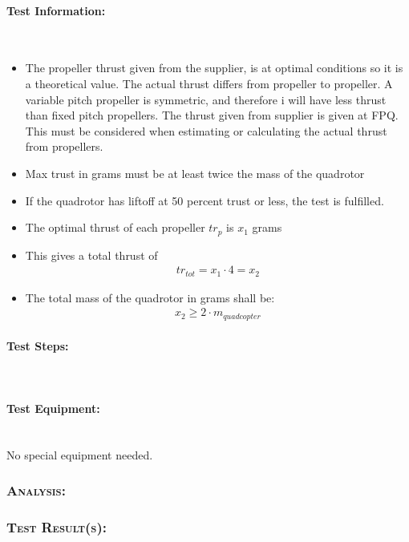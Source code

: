 \paragraph{Test Information:}\mbox{}\\
\begin{itemize}
\item  The propeller thrust given from the supplier, is at optimal conditions so it is a theoretical value. The actual thrust differs from propeller to propeller. A variable pitch propeller is symmetric, and therefore i will have less thrust than fixed pitch propellers. The thrust given from supplier is given at FPQ. This must be considered when estimating or calculating the actual thrust from propellers.
\item Max trust in grams must be at least twice the mass of the quadrotor
\item If the quadrotor has liftoff at 50 percent trust or less, the test is fulfilled.
\item The optimal thrust of each propeller $tr_p$ is $x_1$ grams
\item This gives a total thrust of
    \begin{equation}
    \begin{split}
        tr_{tot} = x_1\cdot4 = x_2
    \end{split}
    \end{equation}
\item The total mass of the quadrotor in  grams shall be:
    \begin{equation}
    \begin{split}
        x_2 \geq 2\cdot m_{quadcopter} 
    \end{split}
    \end{equation}
\end{itemize}
\paragraph{Test Steps:}\mbox{}\\
\paragraph{Test Equipment:}\mbox{}\\
No special equipment needed.
\subsubsection{\textsc{\medium Analysis:}}
\subsubsection{\textsc{\medium Test Result(s):}}
\newpage